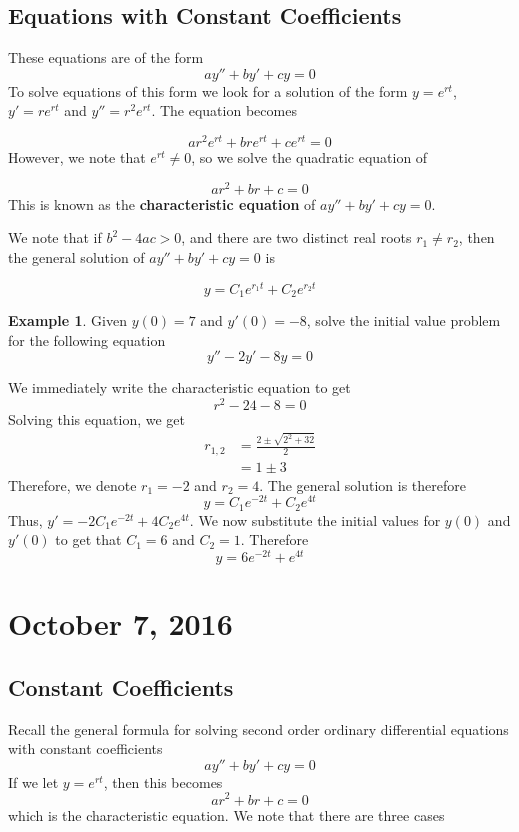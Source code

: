 \documentclass[11pt]{article}
\theoremstyle{plain} %
\theoremstyle{definition}
\theoremstyle{example}
\newtheorem*{example}{Example}
\theoremstyle{remark}
\begin{document}
\subsection{Equations with Constant Coefficients}

These equations are of the form $$ay'' + by' + cy = 0$$
To solve equations of this form we look for a solution of the form $y = e^{rt}$, $y' = re^{rt}$ and $y'' = r^2e^{rt}$. The equation becomes

$$ar^2e^{rt} + bre^{rt} + ce^{rt} = 0$$
However, we note that $e^{rt} \neq 0$, so we solve the quadratic equation of

$$ar^2+br+c=0$$
This is known as the \textbf{characteristic equation} of $ay'' + by' + cy = 0$.

We note that if $b^2-4ac > 0$, and there are two distinct real roots $r_1 \neq r_2$, then the general solution of $ay'' + by' + cy = 0$ is 

$$y = C_1e^{r_1t} + C_2e^{r_2t}$$

\begin{example}
Given $y(0) = 7$ and $y'(0)=-8$, solve the initial value problem for the following equation
$$y'' -2y'-8y=0$$
\end{example} We immediately write the characteristic equation to get $$r^2-24-8=0$$
Solving this equation, we get 
\begin{align*}
r_{1,2} &= \frac{2 \pm \sqrt{2^2 + 32}}{2}\\
&= 1 \pm 3
\end{align*}
Therefore, we denote $r_1=-2$ and $r_2 = 4$. The general solution is therefore
$$y=C_1e^{-2t}+C_2e^{4t}$$
Thus, $y' = -2C_1e^{-2t} + 4C_2e^{4t}$. We now substitute the initial values for $y(0)$ and $y'(0)$ to get that $C_1 = 6$ and $C_2 = 1$. Therefore
$$y = 6e^{-2t}+e^{4t}$$

\section{October 7, 2016}
\subsection{Constant Coefficients}

Recall the general formula for solving second order ordinary differential equations with constant coefficients
$$ay'' + by' + cy=0$$
If we let $y = e^{rt}$, then this becomes
$$ar^2+br+c=0$$
which is the characteristic equation. We note that there are three cases
\end{document}
